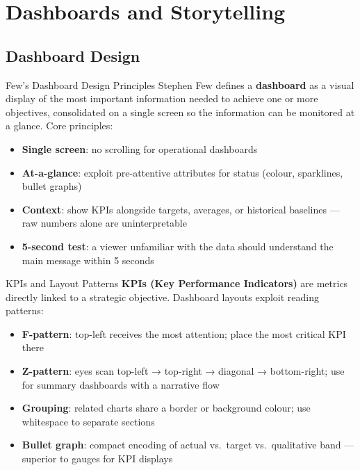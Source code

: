 \section{Dashboards and Storytelling}

\subsection{Dashboard Design}

\begin{v3topic}{Few's Dashboard Design Principles}
    Stephen Few defines a \textbf{dashboard} as a visual display of the most important
    information needed to achieve one or more objectives, consolidated on a single screen
    so the information can be monitored at a glance.
    Core principles:
    \begin{itemize}
        \item \textbf{Single screen}: no scrolling for operational dashboards
        \item \textbf{At-a-glance}: exploit pre-attentive attributes for status (colour,
              sparklines, bullet graphs)
        \item \textbf{Context}: show KPIs alongside targets, averages, or historical
              baselines --- raw numbers alone are uninterpretable
        \item \textbf{5-second test}: a viewer unfamiliar with the data should understand
              the main message within 5 seconds
    \end{itemize}

\end{v3topic}
\begin{v3topic}{KPIs and Layout Patterns}
    \textbf{KPIs (Key Performance Indicators)} are metrics directly linked to a strategic
    objective. Dashboard layouts exploit reading patterns:
    \begin{itemize}
        \item \textbf{F-pattern}: top-left receives the most attention; place the most
              critical KPI there
        \item \textbf{Z-pattern}: eyes scan top-left → top-right → diagonal → bottom-right;
              use for summary dashboards with a narrative flow
        \item \textbf{Grouping}: related charts share a border or background colour;
              use whitespace to separate sections
        \item \textbf{Bullet graph}: compact encoding of actual vs.\ target vs.\
              qualitative band --- superior to gauges for KPI displays
    \end{itemize}

\end{v3topic}
